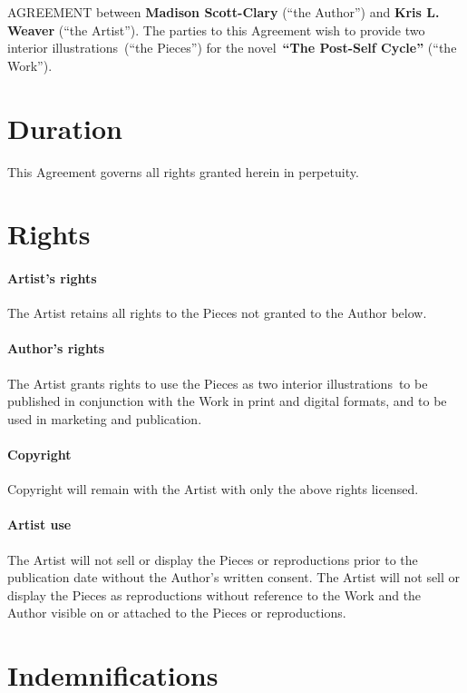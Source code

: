 \documentclass[12pt,letterpaper]{article}
\def\WorkTitle{The Post-Self Cycle}
\def\WorkAuthor{Madison Scott-Clary}
\def\WorkType{novel}
\def\Artist{Kris L. Weaver}
\def\ArtType{two interior illustrations}
\begin{document}
\noindent AGREEMENT between \textbf{\WorkAuthor} (``the Author'') and \textbf{\Artist} (``the Artist''). The parties to this Agreement wish to provide \ArtType\ (``the Pieces'') for the \WorkType\ \textbf{``\WorkTitle''} (``the Work'').

\section{Duration}

This Agreement governs all rights granted herein in perpetuity.

\section{Rights}

\paragraph{Artist's rights}

The Artist retains all rights to the Pieces not granted to the Author below.

\paragraph{Author's rights}

The Artist grants rights to use the Pieces as \ArtType\ to be published in conjunction with the Work in print and digital formats, and to be used in marketing and publication.

\paragraph{Copyright}

Copyright will remain with the Artist with only the above rights licensed.

\paragraph{Artist use}

The Artist will not sell or display the Pieces or reproductions prior to the publication date without the Author's written consent. The Artist will not sell or display the Pieces as reproductions without reference to the Work and the Author visible on or attached to the Pieces or reproductions.

\section{Indemnifications}
\end{document}
